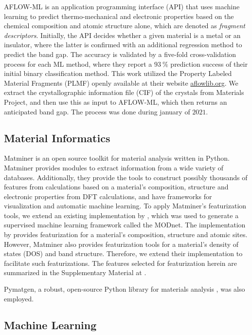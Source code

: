 \documentclass[superscriptaddress,unsortedaddress,
 amsmath,amssymb,
 aps,
]{revtex4-2}
\begin{document}
AFLOW-ML \cite{Isayev2017} is an application programming interface (API) that uses machine learning to predict thermo-mechanical and electronic properties based on the chemical composition and atomic structure alone, which are denoted as \textit{fragment descriptors}. Initially, the API decides whether a given material is a metal or an insulator, where the latter is confirmed with an additional regression method to predict the band gap. The accuracy is validated by a five-fold cross-validation process for each ML method, where they report a $93 \ \%$ prediction success of their initial binary classification method. This work utilized the Property Labeled Material Fragments (PLMF) openly available at their website \url{aflowlib.org}. We extract the crystallographic information file (CIF) of the crystals from Materials Project, and then use this as input to AFLOW-ML, which then returns an anticipated band gap. The process was done during january of $2021$. 

\subsection*{Material Informatics}  
Matminer \cite{Ward2018} is an open source toolkit for material analysis written in Python. Matminer provides modules to extract information from a wide variety of databases. Additionally, they provide the tools to construct possibly thousands of features from calculations based on a material's composition, structure and electronic properties from DFT calculations, and have frameworks for visualization and automatic machine learning. 
To apply Matminer's featurization tools, we extend an existing implementation by \citeauthor{Breuck2021} \cite{Breuck2021}, which was used to generate a supervised machine learning framework called the MODnet. The implementation by \citeauthor{Breuck2021} provides featurization for a material's composition, structure and atomic sites. However, Matminer also provides featurization tools for a material's density of states (DOS) and band structure. Therefore, we extend their implementation to facilitate such featurizations. 
The features selected for featurization herein are summarized in the Supplementary Material at \cite{supplementary}. 

Pymatgen, a robust, open-source Python library for materials analysis \cite{pymatgen}, was also employed. 

\subsection*{Machine Learning} 
\end{document}

